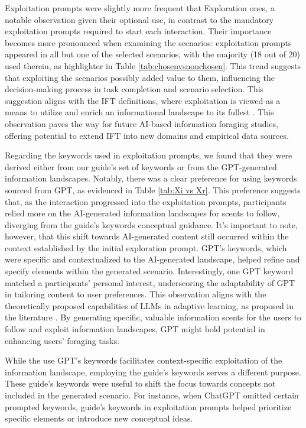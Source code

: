 \documentclass[sn-mathphys, Numbered]{sn-jnl}%
\theoremstyle{thmstyleone}%
\theoremstyle{thmstyletwo}%
\theoremstyle{thmstylethree}%
\begin{document}
Exploitation prompts were slightly more frequent that Exploration ones, a notable observation given their optional use, in contrast to the mandatory exploitation prompts required to start each interaction. Their importance becomes more pronounced when examining the scenarios: exploitation prompts appeared in all but one of the selected scenarios, with the majority (18 out of 20) used therein, as highlighter in Table \ref{tab:chosenvsnonchosen}. This trend suggests that exploiting the scenarios possibly added value to them, influencing the decision-making process in task completion and scenario selection. This suggestion aligns with the IFT definitions, where exploitation is viewed as a means to utilize and enrich an informational landscape to its fullest \parencite{cohen_should_2007, hills_exploration_2015}. This observation paves the way for future AI-based information foraging studies, offering potential to extend IFT into new domains and empirical data sources.

Regarding the keywords used in exploitation prompts, we found that they were derived either from our guide's set of keywords or from the GPT-generated information landscapes. Notably, there was a clear preference for using keywords sourced from GPT, as evidenced in Table \ref{tab:Xi vs Xr}. This preference suggests that, as the interaction progressed into the exploitation prompts, participants relied more on the AI-generated information landscapes for scents to follow, diverging from the guide's keywords conceptual guidance. It's important to note, however, that this shift towards AI-generated content still occurred within the context established by the initial exploration prompt. GPT's keywords, which were specific and contextualized to the AI-generated landscape, helped refine and specify elements within the generated scenario. Interestingly, one GPT keyword matched a participants' personal interest, underscoring the adaptability of GPT in tailoring content to user preferences. This observation aligns with the theoretically proposed capabilities of LLMs in adaptive learning, as proposed in the literature \parencite{bommasani_opportunities_2022, montenegro-rueda_impact_2023,  abu_talib_analytical_2021, lo_what_2023}. By generating specific, valuable information scents for the users to follow and exploit information landscapes, GPT might hold potential in enhancing users' foraging tasks.

While the use GPT's keywords facilitates context-specific exploitation of the information landscape, employing the guide's keywords serves a different purpose. These guide's keywords were useful to shift the focus towards concepts not included in the generated scenario. For instance, when ChatGPT omitted certain prompted keywords, guide's keywords in exploitation prompts helped prioritize specific elements or introduce new conceptual ideas. 
\end{document}
